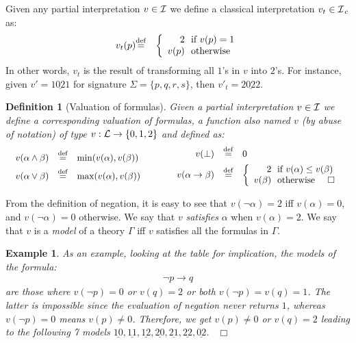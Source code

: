 \documentclass{tlp}
\newcommand{\eqdef}{\mathbin{\stackrel{\mathrm{def}}{=}}}
\def\cI{{\cal I}}
\def\cIc{{\cal I}_{\, c}}
\def\L{{\cal L}}
\def\qed{~\hfill$\Box$}
\newtheorem{definition}{Definition}
\newtheorem{example}{Example}
\newcommand{\str}[1]{\underline{#1}}
\begin{document}
Given any partial interpretation $v \in \cI$ we define a classical interpretation $v_t \in \cIc$ as:
\begin{eqnarray*}
v_t(p) & \eqdef & \left\{
\begin{array}{r@{\ \ }l}
2 & \hbox{if } v(p)=1 \\
v(p) & \hbox{otherwise}
\end{array}
\right.
\end{eqnarray*}
\noindent In other words, $v_t$ is the result of transforming all $1$'s in $v$ into $2$'s. For instance, given $v'=\str{1021}$ for signature $\Sigma=\{p,q,r,s\}$, then $v'_t=\str{2022}$.

\begin{definition}[Valuation of formulas]\label{def:val}
Given a partial interpretation $v \in \cI$ we define a corresponding \emph{valuation of formulas}, a function also named $v$ (by abuse of notation) of type $v: \L \rightarrow \{0,1,2\}$ and defined as:
\[
\begin{array}{c@{\hspace{30pt}}c}
\begin{array}{rcl}
v(\alpha \wedge \beta) & \eqdef & \min(v(\alpha), v(\beta))\\[5pt]
v(\alpha \vee \beta) & \eqdef & \max(v(\alpha), v(\beta)) 
\end{array}
&
\begin{array}{rcl}
v(\bot) & \eqdef & 0 \\[5pt]
v(\alpha \rightarrow \beta) & \eqdef & \left\{
\begin{array}{r@{\ \ }l}
2 & \hbox{if } v(\alpha) \leq v(\beta) \\
v(\beta) & \hbox{otherwise} \hspace{14pt} \Box
\end{array}
\right.
\end{array}
\end{array}
\]
\end{definition}



From the definition of negation, it is easy to see that $v(\neg \alpha)=2$ iff $v(\alpha)=0$, and $v(\neg \alpha)=0$ otherwise.
We say that $v$ \emph{satisfies} $\alpha$ when $v(\alpha)=2$. We say that $v$ is a \emph{model} of a theory $\Gamma$ iff $v$ satisfies all the formulas in $\Gamma$.

\begin{example}\label{ex:1}
As an example, looking at the table for implication, the models of the formula:
\begin{eqnarray}
\neg p \rightarrow q \label{f1}
\end{eqnarray}
\noindent are those where $v(\neg p)=0$ or $v(q)=2$ or both $v(\neg p)=v(q)=1$. The latter is impossible since the evaluation of negation never returns $1$, whereas $v(\neg p)=0$ means $v(p)\neq 0$. Therefore, we get $v(p) \neq 0$ or $v(q)=2$ leading to the following 7 models $\str{10}, \str{11}, \str{12}, \str{20}, \str{21}, \str{22}, \str{02}$.  \qed
\end{example}
\end{document}
